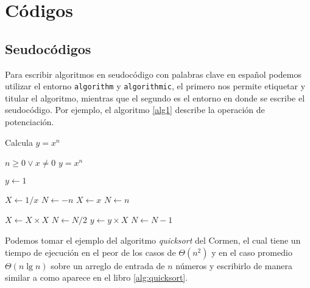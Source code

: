 \section{Códigos}

\subsection{Seudocódigos}
Para escribir algoritmos en seudocódigo con palabras clave en español podemos utilizar el entorno 
\texttt{algorithm} y \texttt{algorithmic}, el primero nos permite etiquetar y titular el 
algoritmo, mientras que el segundo es el entorno en donde se escribe el seudocódigo. Por ejemplo, 
el algoritmo \cref{alg1} describe la operación de potenciación.\\

\begin{algorithm}
	\caption{Calcula $y = x^n$}
    \label{alg1}
    \begin{algorithmic}
		\REQUIRE $n \geq 0 \vee x \neq 0$
        \ENSURE $y = x^n$
        
        \STATE $y \leftarrow 1$
        
        	\STATE $X \leftarrow 1 / x$
            \STATE $N \leftarrow -n$
        \ELSE
        	\STATE $X \leftarrow x$
            \STATE $N \leftarrow n$
        \ENDIF
        
            	\STATE $X \leftarrow X \times X$
                \STATE $N \leftarrow N / 2$
            \ELSE[$N$ es impar]
            	\STATE $y \leftarrow y \times X$
                \STATE $N \leftarrow N - 1$
            \ENDIF
        \ENDWHILE
	\end{algorithmic}
\end{algorithm}

Podemos tomar el ejemplo del algoritmo \emph{quicksort} del Cormen, el cual tiene un tiempo de 
ejecución en el peor de los casos de $\Theta \left(n^2 \right)$ y en el caso promedio $\Theta 
\left( n \lg n \right)$ sobre un arreglo de entrada de $n$ números y escribirlo de manera similar 
a como aparece en el libro \cref{alg:quicksort}.\\


